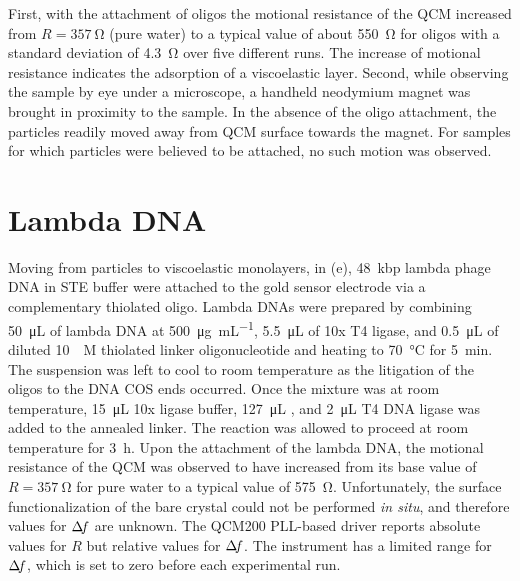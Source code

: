 First, with the attachment of oligos the motional resistance of the QCM
increased from $R=\SI{357}{\ohm}$ (pure water) to a typical value of about
\SI{550}{\ohm} for oligos with a standard deviation of \SI{4.3}{\ohm} over
five different runs.  The increase of motional resistance indicates the
adsorption of a viscoelastic layer.  Second, while observing the sample by
eye under a microscope, a handheld neodymium magnet was brought in
proximity to the sample.  In the absence of the oligo attachment, the
particles readily moved away from QCM surface towards the magnet.  For
samples for which particles were believed to be attached, no such motion
was observed.


\section{Lambda DNA}
Moving from particles to viscoelastic monolayers, in
(e), \SI{48}{kbp} lambda phage DNA in STE buffer were
attached to the gold sensor electrode via a complementary thiolated oligo.
Lambda DNAs were prepared by combining \SI{50}{\micro\liter} of lambda DNA
at \SI{500}{\micro\gram\per\milli\liter}, \SI{5.5}{\micro\liter} of 10x T4
ligase, and \SI{0.5}{\micro\liter} of diluted \SI{10}{\micro\textsc{M}}
thiolated linker oligonucleotide and heating to \SI{70}{\celsius} for
\SI{5}{\minute}.  The suspension was left to cool to room temperature as
the litigation of the oligos to the DNA COS ends occurred. Once the mixture
was at room temperature, \SI{15}{\micro\liter} 10x ligase buffer,
\SI{127}{\micro\liter} , and \SI{2}{\micro\liter} T4 DNA ligase was
added to the annealed linker.  The reaction was allowed to proceed at room
temperature for \SI{3}{\hour}.  Upon the attachment of the lambda DNA, the
motional resistance of the QCM was observed to have increased from its base
value of $R=\SI{357}{\ohm}$ for pure water to a typical value of
\SI{575}{\ohm}.  Unfortunately, the surface functionalization of the bare
crystal could not be performed \textit{in situ}, and therefore values for
$\Delta\!f$ are unknown.  The QCM200 PLL-based driver reports absolute values for
$R$ but relative values for $\Delta\!f$.  The instrument has a limited range for
$\Delta\!f$, which is set to zero before each experimental run.

